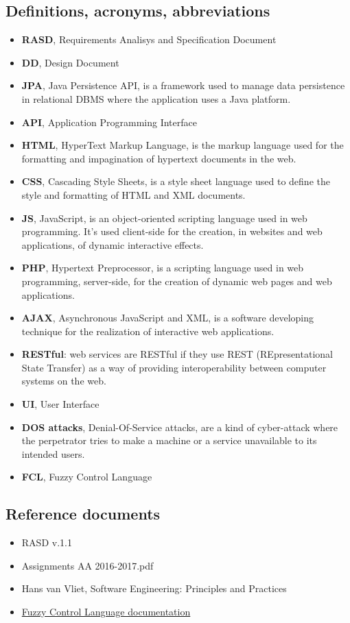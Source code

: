 \subsection{Definitions, acronyms, abbreviations}
	\begin{itemize}
		\item \textbf{RASD}, Requirements Analisys and Specification Document
		\item \textbf{DD}, Design Document
		\item \textbf{JPA}, Java Persistence API, is a framework used to manage data persistence in relational DBMS where the application uses a Java platform.
		\item \textbf{API}, Application Programming Interface
		\item \textbf{HTML}, HyperText Markup Language, is the markup language used for the formatting and impagination of hypertext documents in the web.
		\item \textbf{CSS}, Cascading Style Sheets, is a style sheet language used to define the style and formatting of HTML and XML documents.
		\item \textbf{JS}, JavaScript, is an object-oriented scripting language used in web programming. It's used client-side for the creation, in websites and web applications, of dynamic interactive effects.
		\item \textbf{PHP}, Hypertext Preprocessor, is a scripting language used in web programming, server-side, for the creation of dynamic web pages and web applications.
		\item \textbf{AJAX}, Asynchronous JavaScript and XML, is a software developing technique for the realization of interactive web applications.
		\item \textbf{RESTful}: web services are RESTful if they use REST (REpresentational State Transfer) as a way of providing interoperability between computer systems on the web.
		\item \textbf{UI}, User Interface
		\item \textbf{DOS attacks}, Denial-Of-Service attacks, are a kind of cyber-attack where the perpetrator tries to make a machine or a service unavailable to its intended users.
		\item \textbf{FCL}, Fuzzy Control Language
	\end{itemize}

\subsection{Reference documents}
	\begin{itemize}
		\item RASD v.1.1
		\item Assignments AA 2016-2017.pdf
		\item Hans van Vliet, Software Engineering: Principles and Practices
		\item \href{http://ffll.sourceforge.net/fcl.htm}{Fuzzy Control Language documentation}
	\end{itemize}

